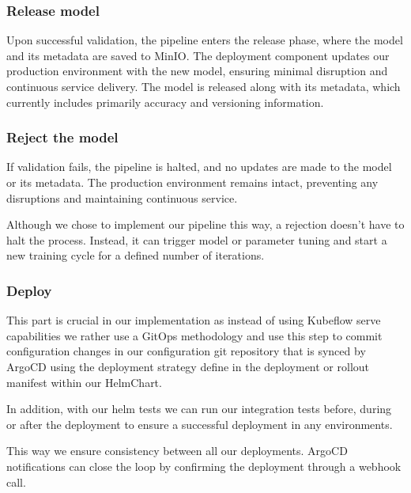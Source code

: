 \subsubsection{Release model}
Upon successful validation, the pipeline enters the release phase, where the model and its metadata are saved to MinIO\@.
The deployment component updates our production environment with the new model, ensuring minimal disruption and continuous service delivery.
The model is released along with its metadata, which currently includes primarily accuracy and versioning information.

\subsubsection{Reject the model}
If validation fails, the pipeline is halted, and no updates are made to the model or its metadata.
The production environment remains intact, preventing any disruptions and maintaining continuous service.

Although we chose to implement our pipeline this way, a rejection doesn't have to halt the process.
Instead, it can trigger model or parameter tuning and start a new training cycle for a defined number of iterations.

\subsubsection{Deploy}
This part is crucial in our implementation as instead of using Kubeflow serve capabilities we rather use a GitOps methodology
and use this step to commit configuration changes in our configuration git repository that is synced by ArgoCD
using the deployment strategy define in the deployment or rollout manifest within our HelmChart.

In addition, with our helm tests we can run our integration tests before,
during or after the deployment to ensure a successful deployment in any environments.

This way we ensure consistency between all our deployments. %
ArgoCD notifications can close the loop by confirming the deployment through a webhook call.
